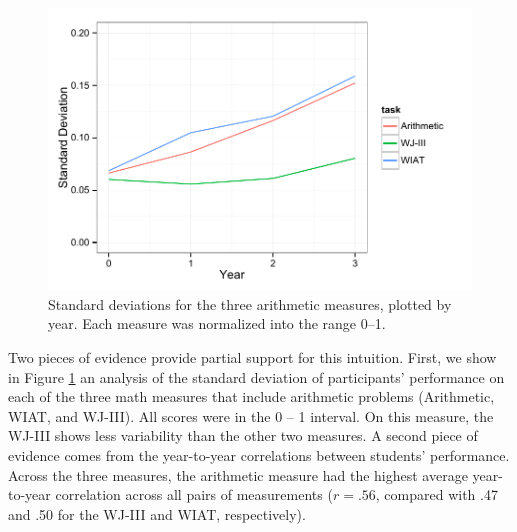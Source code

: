 \documentclass[11pt]{article}
\begin{document}
\begin{figure}[H]
\begin{center}
\includegraphics[width=4.5in]{figures/SDs.pdf}
\end{center}
\caption{Standard deviations for the three arithmetic measures, plotted by year. Each measure was normalized into the range 0--1.}
\label{fig:sds}
\end{figure}

Two pieces of evidence provide partial support for this intuition. First, we show in Figure \ref{fig:sds} an analysis of the standard deviation of participants' performance on each of the three math measures that include arithmetic problems (Arithmetic, WIAT, and WJ-III). All scores were in the 0 -- 1 interval.  On this measure, the WJ-III shows less variability than the other two measures. A second piece of evidence comes from the year-to-year correlations between students' performance. Across the three measures, the arithmetic measure had the highest average year-to-year correlation across all pairs of measurements ($r = .56$, compared with .47 and .50 for the WJ-III and WIAT, respectively). 


\newpage


 
\end{document}
